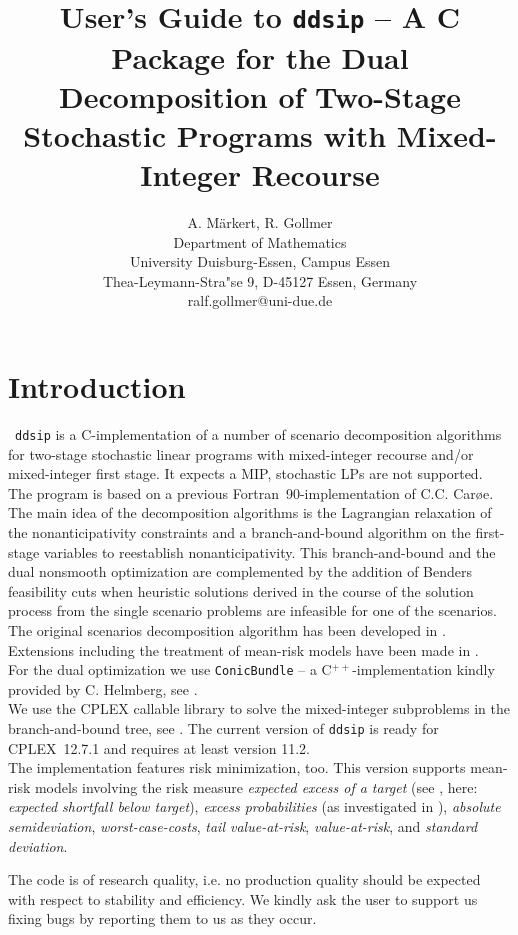 \documentclass[11pt,draft]{article}
\title{\huge User's Guide to \texttt{ddsip} -- A C Package for the Dual
Decomposition of Two-Stage Stochastic Programs with Mixed-Integer Recourse}
\author{A. M\"arkert, R. Gollmer\\
	Department of Mathematics\\
	University Duisburg-Essen, Campus Essen\\
	Thea-Leymann-Stra"se 9, D-45127 Essen, Germany\\
	\small ralf.gollmer@uni-due.de
}
\newcommand{\+}{{\ti{+}}}
\newcommand{\1}{{\ti{1}}}
\begin{document}
\maketitle

\section{Introduction}
 \texttt{ddsip} is a C-implementation of a number of scenario decomposition algorithms for two-stage
stochastic linear programs with mixed-integer recourse and/or mixed-integer first stage.
It expects a MIP, stochastic LPs are not supported.\\[0.5em]
The program is based on a previous Fortran~90-implementation of C.C. Car\o e.
The main idea of the decomposition algorithms is the Lagrangian relaxation of the
non\-anti\-ci\-pa\-tivity constraints and a branch-and-bound algorithm on the first-stage variables to reestablish
non\-anti\-ci\-pa\-tivity. This branch-and-bound and the dual nonsmooth optimization are complemented by the
addition of Benders feasibility cuts when heuristic solutions derived in the course of the solution process
from the single scenario problems are infeasible for one of the scenarios.\\[0.5em]
The original scenarios decomposition algorithm has been developed in
\cite{cs1}. Extensions including the treatment of mean-risk models have been made in \cite{diss}. \\[0.6em]
For the dual optimization we use \texttt{ConicBundle} -- a C$^{++}$-implementation kindly provided by
C. Helmberg, see \cite{CB}.\\
We use the CPLEX callable library to solve the mixed-integer subproblems in
the branch-and-bound tree, see \cite{cp}. The current version of \texttt{ddsip} is ready for CPLEX~12.7.1
and requires at least version 11.2.\\[0.8em]
The implementation features risk minimization, too. This version supports mean-risk models involving
the risk measure {\it expected excess of a target} (see \cite{og}, here: {\it expected shortfall below
target}), {\it excess probabilities} (as investigated in \cite{tied}), {\it absolute semideviation},
{\it worst-case-costs}, {\it tail value-at-risk}, {\it value-at-risk}, and {\it standard deviation}.

The code is of research quality, i.e. no production quality should be expected with respect to stability
and efficiency.
We kindly ask the user to support us fixing bugs by reporting them to us as they occur.
\end{document}

